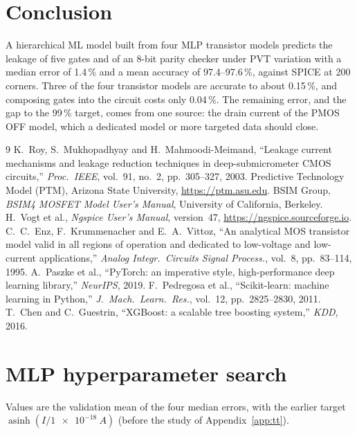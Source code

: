 \documentclass[11pt,a4paper]{article}
\begin{document}
\section{Conclusion}
A hierarchical ML model built from four MLP transistor models predicts the leakage of five gates and of
an 8-bit parity checker under PVT variation with a median error of 1.4\,\% and a mean accuracy of
97.4--97.6\,\%, against SPICE at 200 corners. Three of the four transistor models are accurate to about
0.15\,\%, and composing gates into the circuit costs only 0.04\,\%. The remaining error, and the gap to
the 99\,\% target, comes from one source: the drain current of the PMOS OFF model, which a dedicated
model or more targeted data should close.

\begin{thebibliography}{9}
 K.~Roy, S.~Mukhopadhyay and H.~Mahmoodi-Meimand, ``Leakage current mechanisms and
  leakage reduction techniques in deep-submicrometer CMOS circuits,'' \emph{Proc.\ IEEE}, vol.~91,
  no.~2, pp.~305--327, 2003.
 Predictive Technology Model (PTM), Arizona State University, \url{https://ptm.asu.edu}.
 BSIM Group, \emph{BSIM4 MOSFET Model User's Manual}, University of California, Berkeley.
 H.~Vogt et al., \emph{Ngspice User's Manual}, version~47, \url{https://ngspice.sourceforge.io}.
 C.~C.~Enz, F.~Krummenacher and E.~A.~Vittoz, ``An analytical MOS transistor model valid
  in all regions of operation and dedicated to low-voltage and low-current applications,''
  \emph{Analog Integr.\ Circuits Signal Process.}, vol.~8, pp.~83--114, 1995.
 A.~Paszke et al., ``PyTorch: an imperative style, high-performance deep learning
  library,'' \emph{NeurIPS}, 2019.
 F.~Pedregosa et al., ``Scikit-learn: machine learning in Python,'' \emph{J.\ Mach.\
  Learn.\ Res.}, vol.~12, pp.~2825--2830, 2011.
 T.~Chen and C.~Guestrin, ``XGBoost: a scalable tree boosting system,'' \emph{KDD}, 2016.
\end{thebibliography}

\appendix
\section{MLP hyperparameter search}
\label{app:mlp}
Values are the validation mean of the four median errors, with the earlier target
$\operatorname{asinh}(I/\SI{1e-18}{A})$ (before the study of Appendix~\ref{app:tt}).
\end{document}
